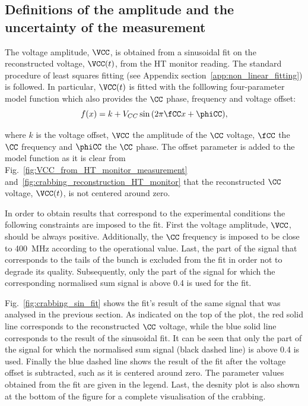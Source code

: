 \subsection{Definitions of the amplitude and the uncertainty of the measurement}\label{subsec:def_amplt_uncertainty}
The voltage amplitude, $\VCC$, is obtained from a sinusoidal fit on the reconstructed voltage, $\VCC (t)$, from the HT monitor reading. The standard procedure of least squares fitting (see Appendix section~\ref{app:non_linear_fitting}) is followed. In particular, $\VCC (t)$ is fitted with the folllowing four-parameter model function which also provides the $\CC$ phase, frequency and voltage offset:
\begin{equation}\label{eq:sin_fit_cc}
   f(x) = k + V_{CC}\sin{(2\pi \fCC x + \phiCC)},
\end{equation}

where $k$ is the voltage offset, $\VCC$ the amplitude of the $\CC$ voltage, $\fCC$ the $\CC$ frequency and $\phiCC$ the $\CC$ phase. The offset parameter is added to the model function as it is clear from Fig.~\ref{fig:VCC_from_HT_monitor_measurement} and~\ref{fig:crabbing_reconstruction_HT_monitor} that the reconstructed $\CC$ voltage, $\VCC(t)$, is not centered around zero.

In order to obtain results that correspond to the experimental conditions the following constraints are imposed to the fit. First the voltage amplitude, $\VCC$, should be always positive. Additionally, the $\CC$ frequency is imposed to be close to 400\, MHz according to the operational value. Last, the part of the signal that corresponds to the tails of the bunch is excluded from the fit in order not to degrade its quality. Subsequently, only the part of the signal for which the corresponding normalised sum signal is above 0.4 is used for the fit. 

Fig.~\ref{fig:crabbing_sin_fit} shows the fit's result of the same signal that was analysed in the previous section. As indicated on the top of the plot, the red solid line corresponds to the reconstructed $\CC$ voltage, while the blue solid line corresponds to the result of the sinusoidal fit. It can be seen that only the part of the signal for which the normalised sum signal (black dashed line) is above 0.4 is used. Finally the blue dashed line shows the result of the fit after the voltage offset is subtracted, such as it is centered around zero. The parameter values obtained from the fit are given in the legend. Last, the desnity plot is also shown at the bottom of the figure for a complete visualisation of the crabbing. 

